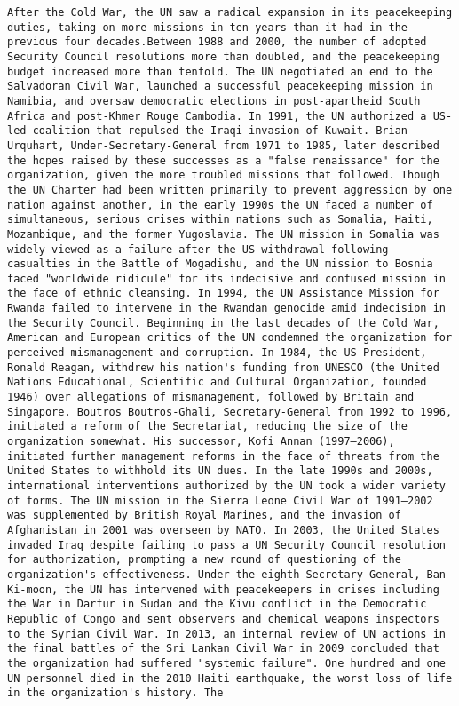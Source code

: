 \documentclass[11pt]{article}
\begin{document}
    \begin{Verbatim}[commandchars=\\\{\}]
After the Cold War, the UN saw a radical expansion in its peacekeeping duties, taking on more missions in ten years than it had in the previous four decades.Between 1988 and 2000, the number of adopted Security Council resolutions more than doubled, and the peacekeeping budget increased more than tenfold. The UN negotiated an end to the Salvadoran Civil War, launched a successful peacekeeping mission in Namibia, and oversaw democratic elections in post-apartheid South Africa and post-Khmer Rouge Cambodia. In 1991, the UN authorized a US-led coalition that repulsed the Iraqi invasion of Kuwait. Brian Urquhart, Under-Secretary-General from 1971 to 1985, later described the hopes raised by these successes as a "false renaissance" for the organization, given the more troubled missions that followed. Though the UN Charter had been written primarily to prevent aggression by one nation against another, in the early 1990s the UN faced a number of simultaneous, serious crises within nations such as Somalia, Haiti, Mozambique, and the former Yugoslavia. The UN mission in Somalia was widely viewed as a failure after the US withdrawal following casualties in the Battle of Mogadishu, and the UN mission to Bosnia faced "worldwide ridicule" for its indecisive and confused mission in the face of ethnic cleansing. In 1994, the UN Assistance Mission for Rwanda failed to intervene in the Rwandan genocide amid indecision in the Security Council. Beginning in the last decades of the Cold War, American and European critics of the UN condemned the organization for perceived mismanagement and corruption. In 1984, the US President, Ronald Reagan, withdrew his nation's funding from UNESCO (the United Nations Educational, Scientific and Cultural Organization, founded 1946) over allegations of mismanagement, followed by Britain and Singapore. Boutros Boutros-Ghali, Secretary-General from 1992 to 1996, initiated a reform of the Secretariat, reducing the size of the organization somewhat. His successor, Kofi Annan (1997–2006), initiated further management reforms in the face of threats from the United States to withhold its UN dues. In the late 1990s and 2000s, international interventions authorized by the UN took a wider variety of forms. The UN mission in the Sierra Leone Civil War of 1991–2002 was supplemented by British Royal Marines, and the invasion of Afghanistan in 2001 was overseen by NATO. In 2003, the United States invaded Iraq despite failing to pass a UN Security Council resolution for authorization, prompting a new round of questioning of the organization's effectiveness. Under the eighth Secretary-General, Ban Ki-moon, the UN has intervened with peacekeepers in crises including the War in Darfur in Sudan and the Kivu conflict in the Democratic Republic of Congo and sent observers and chemical weapons inspectors to the Syrian Civil War. In 2013, an internal review of UN actions in the final battles of the Sri Lankan Civil War in 2009 concluded that the organization had suffered "systemic failure". One hundred and one UN personnel died in the 2010 Haiti earthquake, the worst loss of life in the organization's history. The 
\end{Verbatim}
\end{document}
